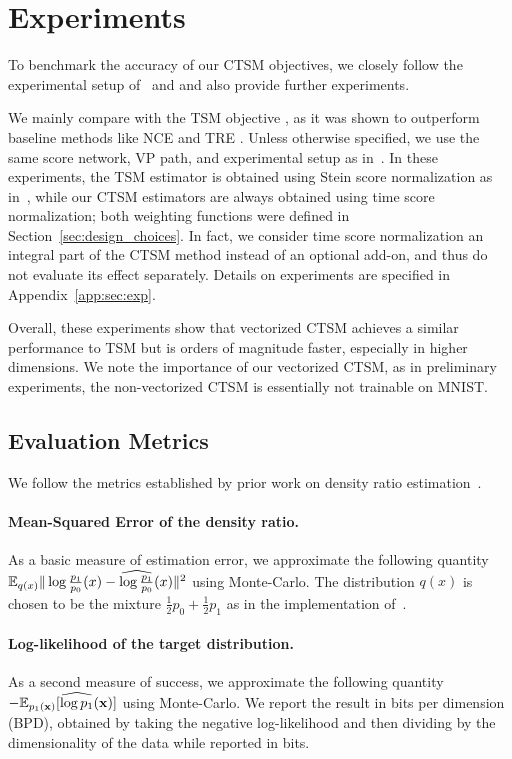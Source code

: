 
\section{Experiments}
\label{sec:experiments}

To benchmark the accuracy of our CTSM objectives, we closely follow the experimental setup of~\citet{Rhodes2020} and \citet{choi2022densityratio} and also provide further experiments.  

We mainly compare with the TSM objective \citep{choi2022densityratio}, as it was shown to outperform baseline methods like NCE \citep{gutmann2012nce} and TRE \citep{Rhodes2020}. Unless otherwise specified, we use the same score network, VP path, and experimental setup as in~\citet{choi2022densityratio}.
In these experiments, the TSM estimator is obtained using Stein score normalization as in~\citet{choi2022densityratio}, while our CTSM estimators are always obtained using time score normalization; both weighting functions were defined in Section~\ref{sec:design_choices}. 
In fact, we consider time score normalization an integral part of the CTSM method instead of an optional add-on, and thus do not evaluate its effect separately.
Details on experiments are specified in  Appendix~\ref{app:sec:exp}.


Overall, these experiments show that vectorized CTSM achieves a similar performance to TSM but is orders of magnitude faster, especially in higher dimensions. We note the importance of our vectorized CTSM, as in preliminary experiments, the non-vectorized CTSM is essentially not trainable on MNIST.

\subsection{Evaluation Metrics} 
We follow the metrics established by prior work on density ratio estimation~\citep{Rhodes2020,choi2022densityratio}.

\paragraph{Mean-Squared Error of the density ratio.}
As a basic measure of estimation error, we approximate the following quantity $\mathbb{E}_{q(x)} \| \log \frac{p_1}{p_0}(x) - \widehat{\log \frac{p_1}{p_0}}(x) \|^2$ using Monte-Carlo. The distribution $q(x)$ is chosen to be the mixture $\frac{1}{2} p_0 + \frac{1}{2} p_1$ as in the implementation of~\citet{choi2022densityratio}.

\paragraph{Log-likelihood of the target distribution.} As a second measure of success, we approximate the following quantity $-\mathbb{E}_{p_1(\operatorname{\mathbf{x}})}[\widehat{\log p_1}(\operatorname{\mathbf{x}})]$  using Monte-Carlo. We report the result in bits per dimension (BPD), obtained by taking the negative log-likelihood and then dividing by the dimensionality of the data while reported in bits. 
    
